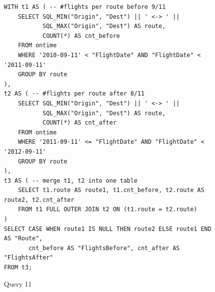 \begin{figure}[t]
\begin{lstlisting}[frame=single]
WITH t1 AS ( -- #flights per route before 9/11
    SELECT SQL_MIN("Origin", "Dest") || ' <-> ' ||
           SQL_MAX("Origin", "Dest") AS route,
           COUNT(*) AS cnt_before
    FROM ontime
    WHERE '2010-09-11' < "FlightDate" AND "FlightDate" < '2011-09-11'
    GROUP BY route
),
t2 AS ( -- #flights per route after 8/11
    SELECT SQL_MIN("Origin", "Dest") || ' <-> ' ||
           SQL_MAX("Origin", "Dest") AS route,
           COUNT(*) AS cnt_after
    FROM ontime
    WHERE '2011-09-11' <= "FlightDate" AND "FlightDate" < '2012-09-11'
    GROUP BY route
),
t3 AS ( -- merge t1, t2 into one table
    SELECT t1.route AS route1, t1.cnt_before, t2.route AS route2, t2.cnt_after
    FROM t1 FULL OUTER JOIN t2 ON (t1.route = t2.route)
)
SELECT CASE WHEN route1 IS NULL THEN route2 ELSE route1 END AS "Route",
       cnt_before AS "FlightsBefore", cnt_after AS "FlightsAfter"
FROM t3;
\end{lstlisting}
  \caption{Query 11}
  \label{sel:sql11}
\end{figure}


